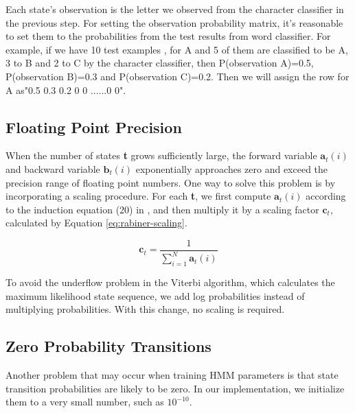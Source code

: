 \begin{enumerate}
Each state's observation is the letter we observed from the character classifier in the previous step. For setting the observation probability matrix, it's reasonable to set them to the probabilities from the test results from word classifier. For example, if we have 10 test examples , for A and 5 of them are classified to be A, 3 to B and 2 to C by the character classifier, then P(observation A)=0.5, P(observation B)=0.3 and P(observation C)=0.2. Then we will assign the row for A as"0.5 0.3 0.2 0 0 ......0 0".

\end{enumerate}

\subsection{Floating Point Precision}

When the number of states \textbf{t} grows sufficiently large, the forward variable $\textbf{a}_t(i)$ and backward variable  $\textbf{b}_t(i)$  exponentially approaches zero and exceed the precision range of floating point numbers.
One way to solve this problem is by incorporating a scaling procedure.
For each \textbf{t}, we first compute $\textbf{a}_t(i)$ according to the induction equation (20) in  \cite{Rabiner1989}, and then multiply it by a scaling factor  $\textbf{c}_t$, calculated by Equation \ref{eq:rabiner-scaling}.

\begin{equation}\label{eq:rabiner-scaling}
\textbf{c}_t = \frac{1}{ \displaystyle\sum_{i=1}^N \textbf{a}_t(i)}
\end{equation}

To avoid the underflow problem in the Viterbi algorithm, which calculates the maximum likelihood state sequence, we add log probabilities instead of multiplying probabilities.
With this change, no scaling is required.

\subsection{Zero Probability Transitions}
Another problem that may occur when training HMM parameters is that state transition probabilities are likely to be zero.
In our implementation, we initialize them to a very small number, such as \textbf{ $10^{-10}$}.



